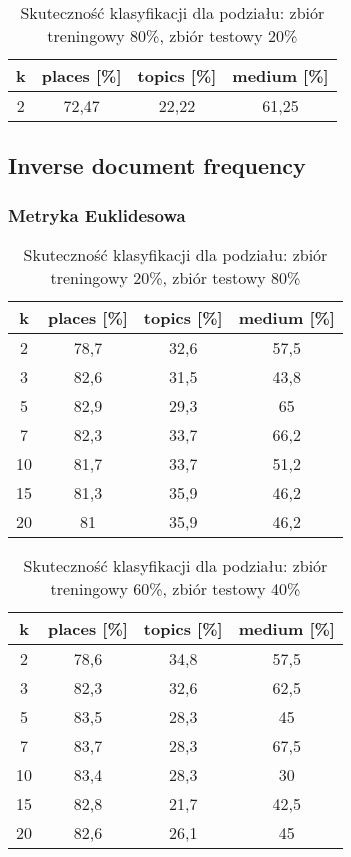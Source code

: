 \documentclass{classrep}
\begin{document}
\begin{table}[H]
	\centering
	\begin{tabular}{c c c c} 
		\hline
		\textbf{k} & \textbf{places [\%]} & \textbf{topics [\%]} &  \textbf{medium [\%]} \\ [0.5ex] 
		\hline
		\hline 
			2 & 72,47 & 22,22 & 61,25 \\ 
		\hline
	\end{tabular}
	\caption{Skuteczność klasyfikacji dla podziału: zbiór treningowy 80\%, zbiór testowy 20\%}
\end{table}

\subsection{Inverse document frequency}

\subsubsection{Metryka Euklidesowa}
\begin{table}[H]
	\centering
	\begin{tabular}{c c c c} 
		\hline
		\textbf{k} & \textbf{places [\%]} & \textbf{topics [\%]} &  \textbf{medium [\%]} \\ [0.5ex] 
		\hline
		\hline 
2 & 78,7 & 32,6 & 57,5 \\ 
3 & 82,6 & 31,5 & 43,8 \\ 
5 & 82,9 & 29,3 & 65 \\ 
7 & 82,3 & 33,7 & 66,2 \\ 
10 & 81,7 & 33,7 & 51,2 \\ 
15 & 81,3 & 35,9 & 46,2 \\ 
20 & 81 & 35,9 & 46,2 \\ 
		\hline
	\end{tabular}
	\caption{Skuteczność klasyfikacji dla podziału: zbiór treningowy 20\%, zbiór testowy 80\%}
\end{table}

\begin{table}[H]
	\centering
	\begin{tabular}{c c c c} 
		\hline
		\textbf{k} & \textbf{places [\%]} & \textbf{topics [\%]} &  \textbf{medium [\%]} \\ [0.5ex] 
		\hline
		\hline 
2 & 78,6 & 34,8 & 57,5 \\ 
3 & 82,3 & 32,6 & 62,5 \\ 
5 & 83,5 & 28,3 & 45 \\ 
7 & 83,7 & 28,3 & 67,5 \\ 
10 & 83,4 & 28,3 & 30 \\ 
15 & 82,8 & 21,7 & 42,5 \\ 
20 & 82,6 & 26,1 & 45 \\ 
		\hline
	\end{tabular}
	\caption{Skuteczność klasyfikacji dla podziału: zbiór treningowy 60\%, zbiór testowy 40\%}
\end{table}
\end{document}
